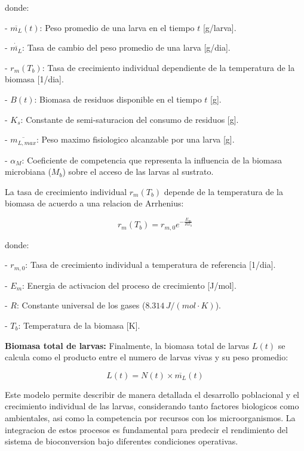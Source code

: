 donde:

- $\overline{m_L}(t)$: Peso promedio de una larva en el tiempo $t$ [g/larva].

- $\dot{\overline{m_L}}$: Tasa de cambio del peso promedio de una larva [g/dia].

- $r_m(T_b)$: Tasa de crecimiento individual dependiente de la temperatura de la biomasa [1/dia].

- $B(t)$: Biomasa de residuos disponible en el tiempo $t$ [g].

- $K_s$: Constante de semi-saturacion del consumo de residuos [g].

- $\overline{m_{L,max}}$: Peso maximo fisiologico alcanzable por una larva [g].

- $\alpha_M$: Coeficiente de competencia que representa la influencia de la biomasa microbiana ($M_b$) sobre el acceso de las larvas al sustrato.

\vspace{1cm}
La tasa de crecimiento individual $r_m(T_b)$ depende de la temperatura de la biomasa de acuerdo a una relacion de Arrhenius:

\begin{equation}
r_m(T_b) = r_{m,0} e^{-\frac{E_m}{R T_b}}
\end{equation}

donde:

- $r_{m,0}$: Tasa de crecimiento individual a temperatura de referencia [1/dia].

- $E_m$: Energia de activacion del proceso de crecimiento [J/mol].

- $R$: Constante universal de los gases ($8.314\, J/(mol \cdot K)$).

- $T_b$: Temperatura de la biomasa [K].


\vspace{1cm}
\textbf{Biomasa total de larvas:} Finalmente, la biomasa total de larvas $L(t)$ se calcula como el producto entre el numero de larvas vivas y su peso promedio:

\begin{equation}
L(t) = N(t) \times \overline{m_L}(t)
\end{equation}

\vspace{1cm}
Este modelo permite describir de manera detallada el desarrollo poblacional y el crecimiento individual de las larvas, considerando tanto factores biologicos como ambientales, asi como la competencia por recursos con los microorganismos. La integracion de estos procesos es fundamental para predecir el rendimiento del sistema de bioconversion bajo diferentes condiciones operativas.

